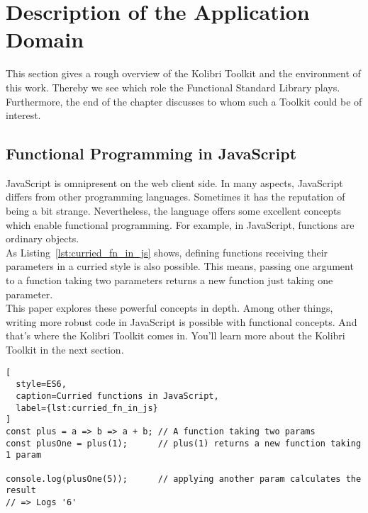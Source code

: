 \section{Description of the Application Domain}
\label{Description of the Application Domain}
This section gives a rough overview of the Kolibri Toolkit and the environment
of this work. Thereby we see which role the Functional Standard Library plays.
Furthermore, the end of the chapter discusses to whom such a Toolkit could be of interest.

\subsection{Functional Programming in JavaScript}
\label{sub:Functional Programming in JavaScript}
JavaScript is omnipresent on the web client side. In many aspects, JavaScript
differs from other programming languages. Sometimes it has the reputation of
being a bit strange. Nevertheless, the language offers some excellent concepts
which enable functional programming. For example, in JavaScript, functions are
ordinary objects. \\
As Listing~\ref{lst:curried_fn_in_js} shows, defining functions receiving their
parameters in a curried style is also possible. This means, passing one
argument to a function taking two parameters returns a new function just taking
one parameter. \\ 
This paper explores these powerful concepts in depth. Among other things,
writing more robust code in JavaScript is possible with functional concepts.
And that’s where the Kolibri Toolkit comes in. You’ll learn more about the
Kolibri Toolkit in the next section.

\begin{lstlisting}[
  style=ES6,
  caption=Curried functions in JavaScript,
  label={lst:curried_fn_in_js}
]
const plus = a => b => a + b; // A function taking two params
const plusOne = plus(1);      // plus(1) returns a new function taking 1 param

console.log(plusOne(5));      // applying another param calculates the result
// => Logs '6'
\end{lstlisting}


